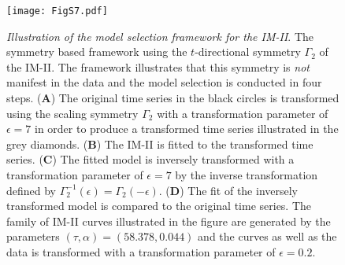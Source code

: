 \begin{figure}[htbp!]
\texttt{[image: FigS7.pdf]}
\caption[Illustration of the model selection framework for the IM-II]{\textit{Illustration of the model selection framework for the IM-II}. The symmetry based framework using the $t$-directional symmetry $\Gamma_{2}$ of the IM-II. The framework illustrates that this symmetry is \textit{not} manifest in the data and the model selection is conducted in four steps. (\textbf{A}) The original time series in the black circles is transformed using the scaling symmetry $\Gamma_{2}$ with a transformation parameter of $\epsilon=7$ in order to produce a transformed time series illustrated in the grey diamonds. (\textbf{B}) The IM-II is fitted to the transformed time series. (\textbf{C}) The fitted model is inversely transformed with a transformation parameter of $\epsilon=7$ by the inverse transformation defined by $\Gamma^{-1}_{2}(\epsilon)=\Gamma_{2}(-\epsilon)$. (\textbf{D}) The fit of the inversely transformed model is compared to the original time series. The family of IM-II curves illustrated in the figure are generated by the parameters $(\tau,\alpha)=(58.378,0.044)$ and the curves as well as the data is transformed with a transformation parameter of $\epsilon=0.2$.}
\label{fig:model_sel_IM_II}
\end{figure}